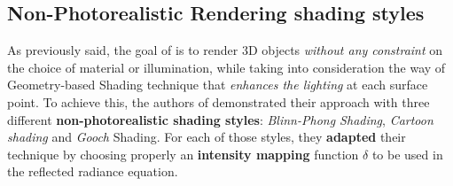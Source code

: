 \subsection{Non-Photorealistic Rendering shading styles}
As previously said, the goal of \cite{referencePaper} is to render 3D objects \textit{without any constraint} on the
choice of material or illumination, while taking into consideration the way of Geometry-based Shading technique that \textit{enhances the lighting} at each surface point. \newline
To achieve this, the authors of \cite{referencePaper} demonstrated their approach with three different \textbf{non-photorealistic shading styles}: \textit{Blinn-Phong Shading}, \textit{Cartoon shading} and \textit{Gooch} Shading. For each of those styles, they \textbf{adapted} their technique by choosing properly an \textbf{intensity mapping} function $\delta$ to be used in the reflected radiance equation.
\pagebreak
